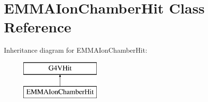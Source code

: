 \hypertarget{classEMMAIonChamberHit}{\section{E\-M\-M\-A\-Ion\-Chamber\-Hit Class Reference}
\label{classEMMAIonChamberHit}
}
Inheritance diagram for E\-M\-M\-A\-Ion\-Chamber\-Hit\-:\begin{figure}[H]
\begin{center}
\leavevmode
\includegraphics[height=2.000000cm]{classEMMAIonChamberHit}
\end{center}
\end{figure}
